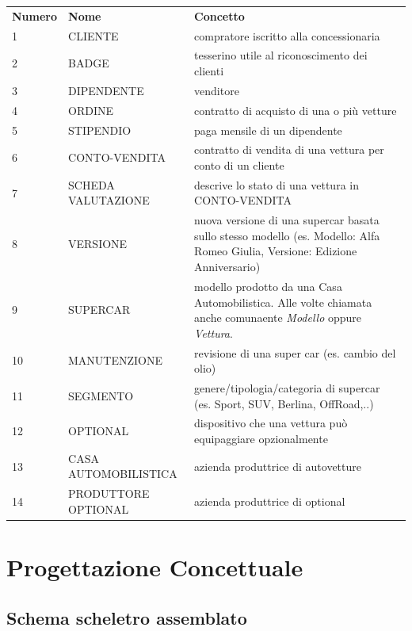 \documentclass[12pt]{article}
\begin{document}
\begin{table}[htbp]
    \centering
    \small
    \begin{tabularx}{\linewidth}{l l X}
        \rowcolor{red!20!}
        \textbf{Numero} & \textbf{Nome} & \textbf{Concetto} \\
        1 & CLIENTE & compratore iscritto alla concessionaria \\
        2 & BADGE & tesserino utile al riconoscimento dei clienti \\
        3 & DIPENDENTE & venditore \\
        4 & ORDINE & contratto di acquisto di una o più vetture \\
        5 & STIPENDIO & paga mensile di un dipendente \\
        6 & CONTO-VENDITA & contratto di vendita di una vettura per conto
        di un cliente \\
        7 & SCHEDA VALUTAZIONE & descrive lo stato di una vettura in
        CONTO-VENDITA\\
        8 & VERSIONE & nuova versione di una supercar basata sullo stesso
        modello (es. Modello: Alfa Romeo Giulia, Versione: Edizione Anniversario) \\
        9 & SUPERCAR & modello prodotto da una Casa Automobilistica. Alle
        volte chiamata anche comunaente \textit{Modello} oppure \textit{Vettura}. \\
        10 & MANUTENZIONE & revisione di una super car (es. cambio del
        olio) \\
        11 & SEGMENTO & genere/tipologia/categoria di supercar (es. Sport, SUV, Berlina, OffRoad,..)\\
        12 & OPTIONAL & dispositivo che una vettura può equipaggiare
        opzionalmente \\
        13 & CASA AUTOMOBILISTICA & azienda produttrice di autovetture \\
        14 & PRODUTTORE OPTIONAL & azienda produttrice di optional \\
    \end{tabularx}
    \label{tab:tabella_linguaggio}
\end{table}

\section{Progettazione Concettuale}

\subsection{Schema scheletro assemblato}
\end{document}
